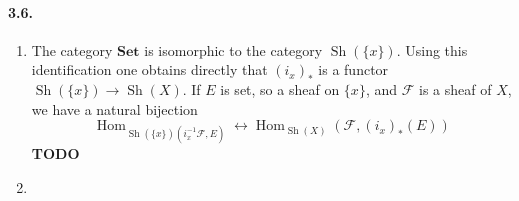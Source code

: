 \documentclass{article}
\newcommand{\F}{\mathcal{F}}
\newcommand{\Set}{\mathbf{Set}}
\DeclareMathOperator{\Sh}{Sh}
\DeclareMathOperator{\Hom}{Hom}
\newcommand{\todo}{\textbf{TODO}}
\begin{document}
\paragraph{3.6.} \begin{enumerate}
    \item The category $\Set$ is isomorphic to the category $\Sh(\{x\})$. Using this identification one obtains directly that $(i_x)_*$ is a functor $\Sh(\{x\}) \to \Sh(X)$. If $E$ is set, so a sheaf on $\{x\}$, and $\F$ is a sheaf of $X$, we have a natural bijection
    \[\Hom_{\Sh(\{x\}) (i_x^{-1}\F,E)} \leftrightarrow \Hom_{\Sh(X)}(\F,(i_x)_*(E))\]
    \todo
    \item 
\end{enumerate}
\end{document}
